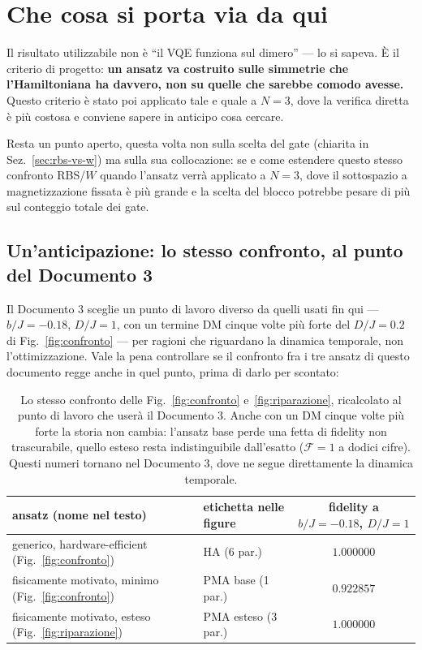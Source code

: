 \documentclass[11pt,a4paper]{article}
\begin{document}
\section{Che cosa si porta via da qui}

Il risultato utilizzabile non è ``il VQE funziona sul dimero'' --- lo si sapeva.
È il criterio di progetto: \textbf{un ansatz va costruito sulle simmetrie che
l'Hamiltoniana ha davvero, non su quelle che sarebbe comodo avesse.} Questo
criterio è stato poi applicato tale e quale a $N=3$, dove la verifica diretta è
più costosa e conviene sapere in anticipo cosa cercare.

Resta un punto aperto, questa volta non sulla scelta del gate (chiarita in
Sez.~\ref{sec:rbs-vs-w}) ma sulla sua collocazione: se e come estendere questo
stesso confronto RBS/$W$ quando l'ansatz verrà applicato a $N=3$, dove il
sottospazio a magnetizzazione fissata è più grande e la scelta del blocco
potrebbe pesare di più sul conteggio totale dei gate.

\subsection*{Un'anticipazione: lo stesso confronto, al punto del Documento 3}

Il Documento 3 sceglie un punto di lavoro diverso da quelli usati fin qui ---
$b/J=-0.18$, $D/J=1$, con un termine DM cinque volte più forte del $D/J=0.2$
di Fig.~\ref{fig:confronto} --- per ragioni che riguardano la dinamica
temporale, non l'ottimizzazione. Vale la pena controllare se il confronto fra
i tre ansatz di questo documento regge anche in quel punto, prima di darlo per
scontato:

\begin{table}[htbp]
\centering
\small
\renewcommand{\arraystretch}{1.3}
\begin{tabular}{@{}llc@{}}
\toprule
\rowcolor{grigetto}
\textbf{ansatz (nome nel testo)} & \textbf{etichetta nelle figure} & \textbf{fidelity a $b/J=-0.18$, $D/J=1$} \\
\midrule
generico, hardware-efficient (Fig.~\ref{fig:confronto}) & HA (6 par.) & $1.000000$ \\
fisicamente motivato, minimo (Fig.~\ref{fig:confronto}) & PMA base (1 par.) & $0.922857$ \\
fisicamente motivato, esteso (Fig.~\ref{fig:riparazione}) & PMA esteso (3 par.) & $1.000000$ \\
\bottomrule
\end{tabular}
\caption{Lo stesso confronto delle Fig.~\ref{fig:confronto}
e~\ref{fig:riparazione}, ricalcolato al punto di lavoro che userà il
Documento 3. Anche con un DM cinque volte più forte la storia non cambia:
l'ansatz base perde una fetta di fidelity non trascurabile, quello esteso
resta indistinguibile dall'esatto ($\mathcal F=1$ a dodici cifre). Questi
numeri tornano nel Documento 3, dove ne segue direttamente la dinamica
temporale.}
\label{tab:preview-doc3}
\end{table}
\end{document}
